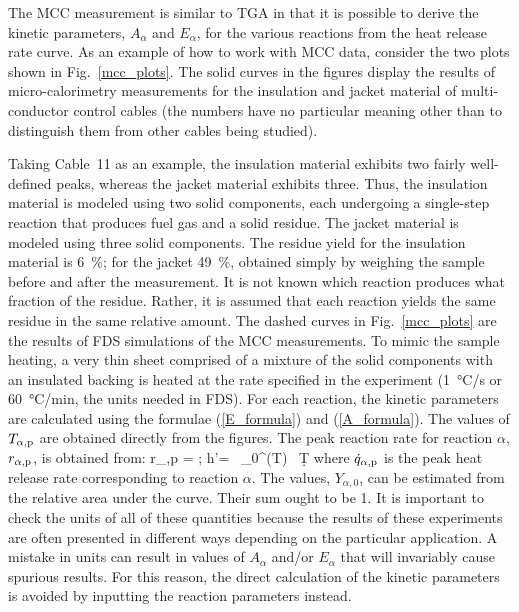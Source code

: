 \documentclass[11pt]{book}
\begin{document}
The MCC measurement is similar to TGA in that it is possible to derive the kinetic parameters, $A_\alpha$ and $E_\alpha$, for the various reactions from the heat release rate curve. As an example of how to work with MCC data, consider the two plots shown in Fig.~\ref{mcc_plots}. The solid curves in the figures display the results of micro-calorimetry measurements for the insulation and jacket material of multi-conductor control cables (the numbers have no particular meaning other than to distinguish them from other cables being studied).

Taking Cable~11 as an example, the insulation material exhibits two fairly well-defined peaks, whereas the jacket material exhibits three. Thus, the insulation material is modeled using two solid components, each undergoing a single-step reaction that produces fuel gas and a solid residue. The jacket material is modeled using three solid components. The residue yield for the insulation material is 6~\%; for the jacket 49~\%, obtained simply by weighing the sample before and after the measurement. It is not known which reaction produces what fraction of the residue. Rather, it is assumed that each reaction yields the same residue in the same relative amount. The dashed curves in Fig.~\ref{mcc_plots} are the results of FDS simulations of the MCC measurements. To mimic the sample heating, a very thin sheet comprised of a mixture of the solid components with an insulated backing is heated at the rate specified in the experiment (1~\unit{\degreeCelsius}/s or 60~\unit{\degreeCelsius}/min, the units needed in FDS). For each reaction, the kinetic parameters are calculated using the formulae (\ref{E_formula}) and (\ref{A_formula}). The values of $T_{\alpha,{\rm p}}$ are obtained directly from the figures. The peak reaction rate for reaction $\alpha$, $r_{\alpha,{\rm p}}$, is obtained from:
\be
   r_{\alpha,{\rm p}} =    \quad ; \quad
   \Delta h'=  \, \int_0^\infty {}(T) \, \d T   \label{r_formula}
\ee
where $\dot{q}_{\alpha,{\rm p}}$ is the peak heat release rate corresponding to reaction $\alpha$. The values, $Y_{\alpha,0}$, can be estimated from the relative area under the curve. Their sum ought to be 1. It is important to check the units of all of these quantities because the results of these experiments are often presented in different ways depending on the particular application. A mistake in units can result in values of $A_\alpha$ and/or $E_\alpha$ that will invariably cause spurious results. For this reason, the direct calculation of the kinetic parameters is avoided by inputting the reaction parameters instead.
\end{document}
